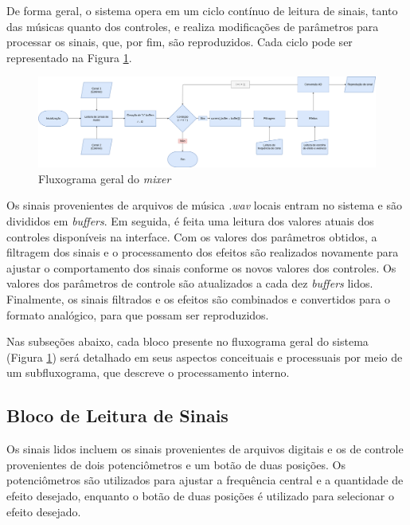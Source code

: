 De forma geral, o sistema opera em um ciclo contínuo de leitura de sinais, tanto das músicas quanto dos controles, e realiza modificações de parâmetros para processar os sinais, que, por fim, são reproduzidos. Cada ciclo pode ser representado na Figura \ref{fig52}.

\begin{figure}[h]
    \centering
    \includegraphics[width=\textwidth]{figuras/fig52.png}
    \caption{Fluxograma geral do \textit{mixer}}
    \label{fig52}
\end{figure}

Os sinais provenientes de arquivos de música \textit{.wav} locais entram no sistema e são divididos em \textit{buffers}. Em seguida, é feita uma leitura dos valores atuais dos controles disponíveis na interface. Com os valores dos parâmetros obtidos, a filtragem dos sinais e o processamento dos efeitos são realizados novamente para ajustar o comportamento dos sinais conforme os novos valores dos controles. Os valores dos parâmetros de controle são atualizados a cada dez \textit{buffers} lidos. Finalmente, os sinais filtrados e os efeitos são combinados e convertidos para o formato analógico, para que possam ser reproduzidos. 

Nas subseções abaixo, cada bloco presente no fluxograma geral do sistema (Figura \ref{fig52}) será detalhado em seus aspectos conceituais e processuais por meio de um subfluxograma, que descreve o processamento interno.

\subsection{Bloco de Leitura de Sinais}

Os sinais lidos incluem os sinais provenientes de arquivos digitais e os de controle provenientes de dois potenciômetros e um botão de duas posições. Os potenciômetros são utilizados para ajustar a frequência central e a quantidade de efeito desejado, enquanto o botão de duas posições é utilizado para selecionar o efeito desejado.

